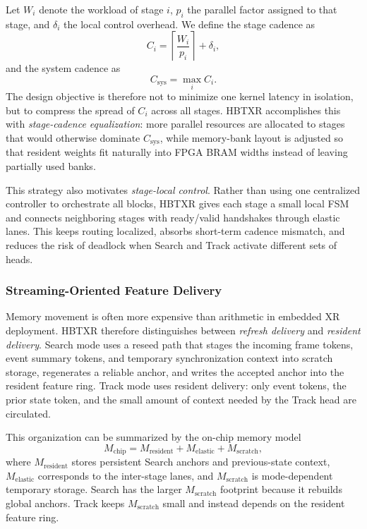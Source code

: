 \documentclass[journal]{IEEEtran}
\begin{document}
Let $W_i$ denote the workload of stage $i$, $p_i$ the parallel factor assigned to that stage, and $\delta_i$ the local control overhead. We define the stage cadence as
\begin{equation}
C_i=\left\lceil\frac{W_i}{p_i}\right\rceil+\delta_i,
\end{equation}
and the system cadence as
\begin{equation}
C_{\mathrm{sys}}=\max_i C_i.
\end{equation}
The design objective is therefore not to minimize one kernel latency in isolation, but to compress the spread of $C_i$ across all stages. HBTXR accomplishes this with \emph{stage-cadence equalization}: more parallel resources are allocated to stages that would otherwise dominate $C_{\mathrm{sys}}$, while memory-bank layout is adjusted so that resident weights fit naturally into FPGA BRAM widths instead of leaving partially used banks.

This strategy also motivates \emph{stage-local control}. Rather than using one centralized controller to orchestrate all blocks, HBTXR gives each stage a small local FSM and connects neighboring stages with ready/valid handshakes through elastic lanes. This keeps routing localized, absorbs short-term cadence mismatch, and reduces the risk of deadlock when Search and Track activate different sets of heads.

\subsubsection{Streaming-Oriented Feature Delivery}
Memory movement is often more expensive than arithmetic in embedded XR deployment. HBTXR therefore distinguishes between \emph{refresh delivery} and \emph{resident delivery}. Search mode uses a reseed path that stages the incoming frame tokens, event summary tokens, and temporary synchronization context into scratch storage, regenerates a reliable anchor, and writes the accepted anchor into the resident feature ring. Track mode uses resident delivery: only event tokens, the prior state token, and the small amount of context needed by the Track head are circulated.

This organization can be summarized by the on-chip memory model
\begin{equation}
M_{\mathrm{chip}} = M_{\mathrm{resident}} + M_{\mathrm{elastic}} + M_{\mathrm{scratch}},
\end{equation}
where $M_{\mathrm{resident}}$ stores persistent Search anchors and previous-state context, $M_{\mathrm{elastic}}$ corresponds to the inter-stage lanes, and $M_{\mathrm{scratch}}$ is mode-dependent temporary storage. Search has the larger $M_{\mathrm{scratch}}$ footprint because it rebuilds global anchors. Track keeps $M_{\mathrm{scratch}}$ small and instead depends on the resident feature ring.
\end{document}

